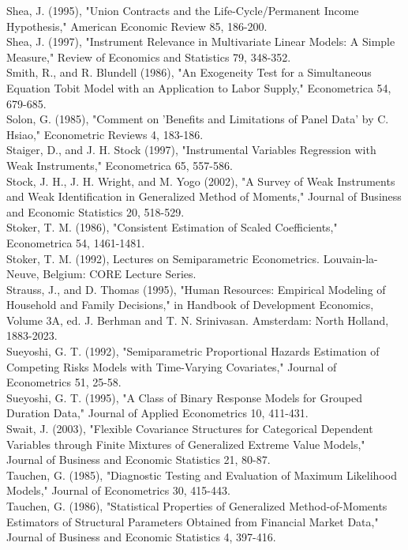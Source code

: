 \documentclass[10pt]{article}
\begin{document}
Shea, J. (1995), "Union Contracts and the Life-Cycle/Permanent Income Hypothesis," American Economic Review 85, 186-200.\\
Shea, J. (1997), "Instrument Relevance in Multivariate Linear Models: A Simple Measure," Review of Economics and Statistics 79, 348-352.\\
Smith, R., and R. Blundell (1986), "An Exogeneity Test for a Simultaneous Equation Tobit Model with an Application to Labor Supply," Econometrica 54, 679-685.\\
Solon, G. (1985), "Comment on 'Benefits and Limitations of Panel Data' by C. Hsiao," Econometric Reviews 4, 183-186.\\
Staiger, D., and J. H. Stock (1997), "Instrumental Variables Regression with Weak Instruments," Econometrica 65, 557-586.\\
Stock, J. H., J. H. Wright, and M. Yogo (2002), "A Survey of Weak Instruments and Weak Identification in Generalized Method of Moments," Journal of Business and Economic Statistics 20, 518-529.\\
Stoker, T. M. (1986), "Consistent Estimation of Scaled Coefficients," Econometrica 54, 1461-1481.\\
Stoker, T. M. (1992), Lectures on Semiparametric Econometrics. Louvain-la-Neuve, Belgium: CORE Lecture Series.\\
Strauss, J., and D. Thomas (1995), "Human Resources: Empirical Modeling of Household and Family Decisions," in Handbook of Development Economics, Volume 3A, ed. J. Berhman and T. N. Srinivasan. Amsterdam: North Holland, 1883-2023.\\
Sueyoshi, G. T. (1992), "Semiparametric Proportional Hazards Estimation of Competing Risks Models with Time-Varying Covariates," Journal of Econometrics 51, 25-58.\\
Sueyoshi, G. T. (1995), "A Class of Binary Response Models for Grouped Duration Data," Journal of Applied Econometrics 10, 411-431.\\
Swait, J. (2003), "Flexible Covariance Structures for Categorical Dependent Variables through Finite Mixtures of Generalized Extreme Value Models," Journal of Business and Economic Statistics 21, 80-87.\\
Tauchen, G. (1985), "Diagnostic Testing and Evaluation of Maximum Likelihood Models," Journal of Econometrics 30, 415-443.\\
Tauchen, G. (1986), "Statistical Properties of Generalized Method-of-Moments Estimators of Structural Parameters Obtained from Financial Market Data," Journal of Business and Economic Statistics 4, 397-416.\\
\end{document}

